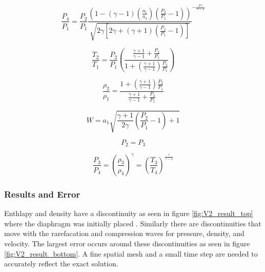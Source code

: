     \begin{equation}
    \label{eq:ref1_7.94}
    	\frac{P_{4}}{P_{1}} = \frac{P_{2}}{P_{1}} \frac{
    	\left( 1 - (\gamma-1)(\frac{a_{1}}{a_{4}})(\frac{P_{2}}{P_{1}} -1) \right) }
    	{\sqrt{2 \gamma \left[ 2 \gamma + (\gamma +1)(\frac{P_{2}}{P_{1}} -1)\right]}}^{
    	- \frac{2 \gamma}{\gamma - 1}}
    \end{equation}
    
    \begin{equation}
    	\frac{T_{2}}{T_{1}} = \frac{P_{2}}{P_{1}} \left(
    	\frac{\frac{\gamma + 1}{\gamma - 1} + \frac{P_{2}}{P_{1}}}
    	{1 + (\frac{\gamma +1}{\gamma - 1}) \frac{P_{2}}{P_{1}}} \right)
    \end{equation}
    
    \begin{equation}
    	\frac{\rho_{2}}{\rho_{1}} =
    	\frac{1 + (\frac{\gamma + 1}{\gamma - 1}) \frac{P_{2}}{P_{1}}}
    	{\frac{\gamma + 1}{\gamma - 1} + \frac{P_{2}}{P_{1}}} 
    \end{equation}
    
    \begin{equation}
    	W = a_{1} \sqrt{ \frac{\gamma + 1}{2 \gamma} 
    	                 \left( \frac{P_{2}}{P_{1}} -1 \right) +1 }
    \end{equation}
    
    \begin{equation}
    	P_{2} = P_{3}
    \end{equation}
    
    \begin{equation}
    	\frac{P_{3}}{P_{4}} = 
    	\left( \frac{\rho_{3}}{\rho_{4}} \right)^{\gamma} =
    	\left( \frac{T_{3}}{T_{4}} \right)^{\frac{\gamma}{\gamma -1}}
    \end{equation}
    
    \subsubsection{Results and Error}
    
    Enthlapy and density have a discontinuity as seen in figure
    \ref{fig:V2_result_top} where the diaphragm was initially placed . Similarly
    there are discontinuities that move with the rarefacation and compression
    waves for pressure, density, and velocity. The largest error occurs around
    these discontinuities as seen in figure \ref{fig:V2_result_bottom}. A 
    fine spatial mesh and a small time step are needed to accurately reflect the
    exact solution.
    
